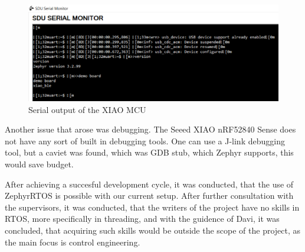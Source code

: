 \documentclass[titlepage,a4paper,11pt]{article}
\begin{document}
\begin{figure}[H]
    \centering
    \includegraphics[scale = 0.7]{serial_monitor.png}
    \caption{Serial output of the XIAO MCU}
    \label{fig:serial}
\end{figure}

Another issue that arose was debugging. The Seeed XIAO nRF52840 Sense does not have any sort of built in debugging tools. \cite{wikiSeeed}
One can use a J-link debugging tool, but a caviet was found, which was GDB stub, which Zephyr supports, this would save budget. \cite{docsZephyr}

After achieving a succesful development cycle, it was conducted, that the use of ZephyrRTOS is possible with our current setup.
After further consultation with the supervisors, it was conducted, that the writers of the project have no skills in RTOS, more specifically in threading, and with the guidence of Davi, it was concluded, that acquiring such skills would be outside the scope of the project, as the main focus is control engineering.

\pagebreak


\end{document}
